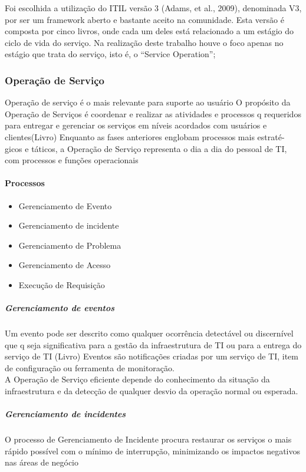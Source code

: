 \documentclass[11pt,a4paper]{article}
\begin{document}
Foi escolhida a utilização do ITIL versão 3 (Adams, et al., 2009), denominada 
V3, por ser um framework aberto e bastante aceito na comunidade. Esta versão é 
composta por cinco livros, onde cada um deles está relacionado a um estágio do 
ciclo de vida do serviço. Na realização deste trabalho houve o foco apenas no 
estágio que trata do serviço, isto é, o “Service Operation”;\\

\subsubsection{Operação de Serviço}
Operação de serviço é o mais relevante para suporte ao usuário
O propósito da Operação de Serviços é coordenar e realizar as atividades e processos q
requeridos para entregar e gerenciar os serviços em níveis acordados com usuários e 
clientes(Livro)
Enquanto as fases anteriores englobam processos mais estraté-
gicos e táticos, a Operação de Serviço representa o dia a dia do pessoal de TI, com processos e 
funções operacionais

\paragraph{Processos}
\begin{itemize}[noitemsep]
	\item Gerenciamento de Evento
	\item Gerenciamento de incidente
	\item Gerenciamento de Problema
	\item Gerenciamento de Acesso
	\item Execução de Requisição
\end{itemize}

\subparagraph{Gerenciamento de eventos}
Um evento pode ser descrito como qualquer ocorrência detectável ou discernível que q
seja significativa para a gestão da infraestrutura de TI ou para a entrega do serviço de TI (Livro)
Eventos são notificações criadas por um serviço de TI, item de configuração ou ferramenta 
de monitoração.\\ A Operação de Serviço eficiente depende do conhecimento da situação 
da infraestrutura e da detecção de qualquer desvio da operação normal ou esperada.


\subparagraph{Gerenciamento de incidentes}
O processo de Gerenciamento de Incidente procura restaurar os serviços o mais rápido 
possível com o mínimo de interrupção, minimizando os impactos negativos nas áreas de negócio
\end{document}
